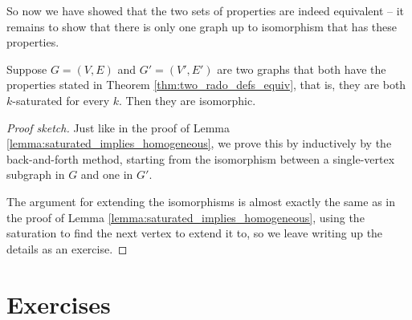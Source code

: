 \documentclass[nobib]{tufte-handout}
\begin{document}
So now we have showed that the two sets of properties are indeed equivalent -- it remains to show that there is only one graph up to isomorphism that has these properties.

\begin{lemma}
    Suppose $G = (V,E)$ and $G' = (V',E')$ are two graphs that both have the properties stated in Theorem \ref{thm:two_rado_defs_equiv}, that is, they are both $k$-saturated for every $k$. Then they are isomorphic.

    \begin{proof}[Proof sketch]
        Just like in the proof of Lemma \ref{lemma:saturated_implies_homogeneous}, we prove this by inductively by the back-and-forth method, starting from the isomorphism between a single-vertex subgraph in $G$ and one in $G'$.

        The argument for extending the isomorphisms is almost exactly the same as in the proof of Lemma \ref{lemma:saturated_implies_homogeneous}, using the saturation to find the next vertex to extend it to, so we leave writing up the details as an exercise.
    \end{proof}
\end{lemma}

\section{Exercises}


%
%
\end{document}
